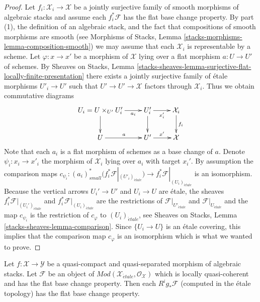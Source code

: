 \begin{proof}
\medskip\noindent
Let $f_i : \mathcal{X}_i \to \mathcal{X}$ be a jointly surjective family of
smooth morphisms of algebraic stacks and assume each $f_i^*\mathcal{F}$
has the flat base change property. By part (1), the definition of
an algebraic stack, and the fact that compositions of smooth morphisms
are smooth (see
Morphisms of Stacks, Lemma \ref{stacks-morphisms-lemma-composition-smooth})
we may assume that each $\mathcal{X}_i$ is representable by a scheme.
Let $\varphi : x \to x'$ be a morphism of $\mathcal{X}$ lying over
a flat morphism $a : U \to U'$ of schemes. By
Sheaves on Stacks, Lemma
\ref{stacks-sheaves-lemma-surjective-flat-locally-finite-presentation}
there exists a jointly surjective family of \'etale morphisms
$U'_i \to U'$ such that $U' \to U' \to \mathcal{X}$ factors through
$\mathcal{X}_i$. Thus we obtain commutative diagrams
$$
\xymatrix{
U_i = U \times_{U'} U_i' \ar[r]_-{a_i} \ar[d] &
U_i' \ar[r]_{x_i'} \ar[d] & \mathcal{X}_i \ar[d]^{f_i} \\
U \ar[r]^a & U' \ar[r]^{x'} & \mathcal{X}
}
$$
Note that each $a_i$ is a flat morphism of schemes as a base change of $a$.
Denote $\psi_i : x_i \to x'_i$ the morphism of $\mathcal{X}_i$ lying over
$a_i$ with target $x_i'$. By assumption the comparison maps
$c_{\psi_i} :
(a_i)_{small}^*\big(f_i^*\mathcal{F}|_{(U'_i)_{\acute{e}tale}}\big)
\to f_i^*\mathcal{F}|_{(U_i)_{\acute{e}tale}}$ is an isomorphism.
Because the vertical arrows $U_i' \to U'$ and $U_i \to U$ are \'etale,
the sheaves $f_i^*\mathcal{F}|_{(U_i')_{\acute{e}tale}}$ and
$f_i^*\mathcal{F}|_{(U_i)_{\acute{e}tale}}$ are the restrictions of
$\mathcal{F}|_{U'_{\acute{e}tale}}$ and $\mathcal{F}|_{U_{\acute{e}tale}}$
and the map $c_{\psi_i}$ is the restriction of $c_\varphi$ to
$(U_i)_{\acute{e}tale}$, see
Sheaves on Stacks, Lemma \ref{stacks-sheaves-lemma-comparison}.
Since $\{U_i \to U\}$ is an \'etale covering, this implies
that the comparison map $c_\varphi$ is an isomorphism which is what
we wanted to prove.
\end{proof}

\begin{lemma}
\label{lemma-flat-comparison}
Let $f : \mathcal{X} \to \mathcal{Y}$ be a quasi-compact and
quasi-separated morphism of algebraic stacks. Let 
$\mathcal{F}$ be an object of
$\textit{Mod}(\mathcal{X}_{\acute{e}tale}, \mathcal{O}_\mathcal{X})$
which is locally quasi-coherent and has the flat base change property.
Then each $R^ig_*\mathcal{F}$ (computed in the \'etale topology)
has the flat base change property.
\end{lemma}

